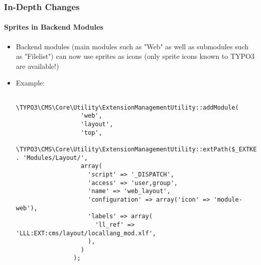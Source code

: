 
\begin{frame}[fragile]
	\frametitle{In-Depth Changes}
	\framesubtitle{Sprites in Backend Modules}

	\lstset{basicstyle=\tiny\ttfamily}

	\begin{itemize}

		\item Backend modules (main modules such as "Web" as well as submodules such as
			"Filelist") can now use sprites as icons\newline
			\small
				(only sprite icons known to TYPO3 are available!)
			\normalsize

		\item Example:

			\begin{lstlisting}
				\TYPO3\CMS\Core\Utility\ExtensionManagementUtility::addModule(
				  'web',
				  'layout',
				  'top',
				  \TYPO3\CMS\Core\Utility\ExtensionManagementUtility::extPath($_EXTKEY) . 'Modules/Layout/',
				  array(
				    'script' => '_DISPATCH',
				    'access' => 'user,group',
				    'name' => 'web_layout',
				    'configuration' => array('icon' => 'module-web'),
				    'labels' => array(
				      'll_ref' => 'LLL:EXT:cms/layout/locallang_mod.xlf',
				    ),
				  )
				);
			\end{lstlisting}

	\end{itemize}

\end{frame}


